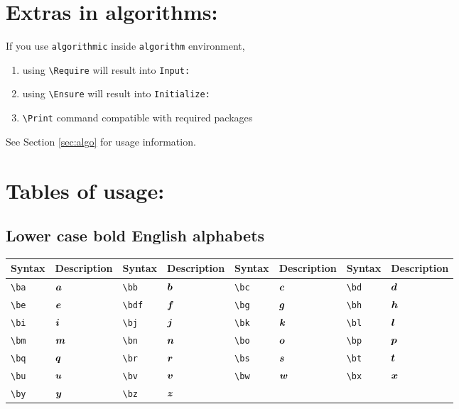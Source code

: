 \documentclass{article}
\begin{document}
	\section{Extras in algorithms:}
	If you use \texttt{algorithmic} inside \texttt{algorithm} environment,
	\begin{enumerate}
		\item using \verb|\Require| will result into \texttt{Input:}
		\item using \verb|\Ensure| will result into \texttt{Initialize:}
		\item \verb|\Print| command compatible with required packages
	\end{enumerate}
	See Section \ref{sec:algo} for usage information.
	
	\newpage
	\section{Tables of usage:}
	\subsection{Lower case bold English alphabets}
	\begin{table}[H]
		\begin{tabular}{|l|l|l|l|l|l|l|l|}
			\hline
			Syntax	&	Description	&	Syntax	&	Description	&	Syntax	&	Description	&	Syntax	&	Description \\
			\hline
			\verb|\ba|	&	$\boldsymbol{a}$	&	\verb|\bb|	&	$\boldsymbol{b}$	&	\verb|\bc|	&	$\boldsymbol{c}$	&	\verb|\bd|	&	$\boldsymbol{d}$ \\
			\verb|\be|	&	$\boldsymbol{e}$	&	\verb|\bdf|	&	$\boldsymbol{f}$	&	\verb|\bg|	&	$\boldsymbol{g}$	&	\verb|\bh|	&	$\boldsymbol{h}$ \\
			\verb|\bi|	&	$\boldsymbol{i}$	&	\verb|\bj|	&	$\boldsymbol{j}$	&	\verb|\bk|	&	$\boldsymbol{k}$	&	\verb|\bl|	&	$\boldsymbol{l}$ \\
			\verb|\bm|	&	$\boldsymbol{m}$	&	\verb|\bn|	&	$\boldsymbol{n}$	&	\verb|\bo|	&	$\boldsymbol{o}$	&	\verb|\bp|	&	$\boldsymbol{p}$ \\
			\verb|\bq|	&	$\boldsymbol{q}$	&	\verb|\br|	&	$\boldsymbol{r}$	&	\verb|\bs|	&	$\boldsymbol{s}$	&	\verb|\bt|	&	$\boldsymbol{t}$ \\
			\verb|\bu|	&	$\boldsymbol{u}$	&	\verb|\bv|	&	$\boldsymbol{v}$	&	\verb|\bw|	&	$\boldsymbol{w}$	&	\verb|\bx|	&	$\boldsymbol{x}$ \\
			\verb|\by|	&	$\boldsymbol{y}$	&	\verb|\bz|	&	$\boldsymbol{z}$	&		&		&		&	 \\
			\hline	
		\end{tabular}
	\end{table}
\end{document}
